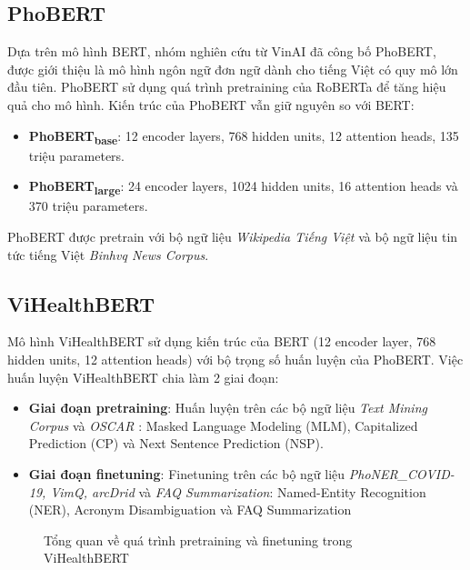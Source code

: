 \subsection{PhoBERT}
Dựa trên mô hình BERT, nhóm nghiên cứu từ VinAI đã công bố PhoBERT\cite{phobert}, được giới thiệu là mô hình ngôn ngữ đơn ngữ dành cho tiếng Việt có quy mô lớn đầu tiên. PhoBERT sử dụng quá trình pretraining của RoBERTa để tăng hiệu quả cho mô hình. Kiến trúc của PhoBERT vẫn giữ nguyên so với BERT:
\begin{itemize}
\item \textbf{PhoBERT\textsubscript{base}}: 12 encoder layers, 768 hidden units, 12 attention heads, 135 triệu parameters.
\item \textbf{PhoBERT\textsubscript{large}}: 24 encoder layers, 1024 hidden units, 16 attention heads và 370 triệu parameters.
\end{itemize}
PhoBERT được pretrain với bộ ngữ liệu \textit{Wikipedia Tiếng Việt} và bộ ngữ liệu tin tức tiếng Việt \textit{Binhvq News Corpus}.

\subsection{ViHealthBERT}
Mô hình ViHealthBERT sử dụng kiến trúc của BERT (12 encoder layer, 768 hidden units, 12 attention heads) với bộ trọng số huấn luyện của PhoBERT. Việc huấn luyện ViHealthBERT chia làm 2 giai đoạn:
\begin{itemize}
\item \textbf{Giai đoạn pretraining}: Huấn luyện trên các bộ ngữ liệu \textit{Text Mining Corpus} và \textit{OSCAR} : Masked Language Modeling (MLM), Capitalized Prediction (CP) và Next Sentence Prediction (NSP).
\item \textbf{Giai đoạn finetuning}: Finetuning trên các bộ ngữ liệu \textit{PhoNER\_COVID-19, VimQ, arcDrid} và \textit{FAQ Summarization}: Named-Entity Recognition (NER), Acronym Disambiguation và FAQ Summarization
\end{itemize}

\begin{figure}
\begin{center}
\caption{Tổng quan về quá trình pretraining và finetuning trong ViHealthBERT\cite{minh-EtAl:2022:LREC}}
\end{center}
\end{figure}